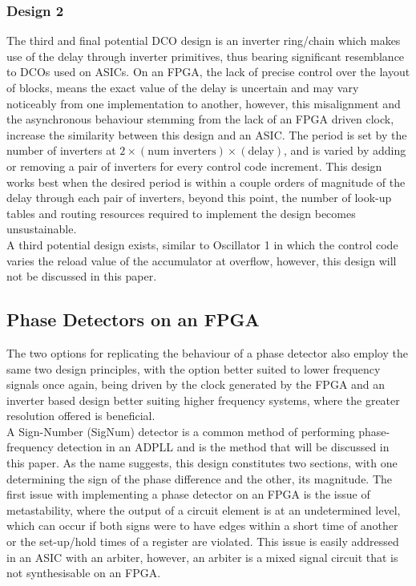 \documentclass[conference]{IEEEtran}
\begin{document}
\subsubsection*{Design 2}
The third and final potential DCO design is an inverter ring/chain which makes use of the delay through inverter primitives, thus bearing significant resemblance to DCOs used on ASICs. On an FPGA, the lack of precise control over the layout of blocks, means the exact value of the delay is uncertain and may vary noticeably from one implementation to another, however, this misalignment and the asynchronous behaviour stemming from the lack of an FPGA driven clock, increase the similarity between this design and an ASIC. The period is set by the number of inverters at $2\times(\textrm{num inverters})\times(\textrm{delay})$, and is varied by adding or removing a pair of inverters for every control code increment. This design works best when the desired period is within a couple orders of magnitude of the delay through each pair of inverters, beyond this point, the number of look-up tables and routing resources required to implement the design becomes unsustainable.\\

A third potential design exists, similar to Oscillator 1 in which the control code varies the reload value of the accumulator at overflow, however, this design will not be discussed in this paper.

\subsection{Phase Detectors on an FPGA}
The two options for replicating the behaviour of a phase detector also employ the same two design principles, with the option better suited to lower frequency signals once again, being driven by the clock generated by the FPGA and an inverter based design better suiting higher frequency systems, where the greater resolution offered is beneficial.\\
A  Sign-Number (SigNum) detector is a common method of performing phase-frequency detection in an ADPLL and is the method that will be discussed in this paper. As the name suggests, this design constitutes two sections, with one determining the sign of the phase difference and the other, its magnitude. The first issue with implementing a phase detector on an FPGA is the issue of metastability, where the output of a circuit element is at an undetermined level, which can occur if both signs were to have edges within a short time of another or the set-up/hold times of a register are violated. This issue is easily addressed in an ASIC with an arbiter, however, an arbiter is a mixed signal circuit that is not synthesisable on an FPGA.
\end{document}
